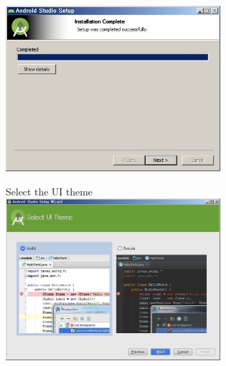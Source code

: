 \documentclass[12pt]{article}
\begin{document}
\begin{center}
\includegraphics[width=80mm,scale=1.3]{android8}
\end{center}

\begin{center}
Select the UI theme\\ [1\baselineskip]
\includegraphics[width=80mm,scale=1.3]{android9}
\end{center}
\end{document}
